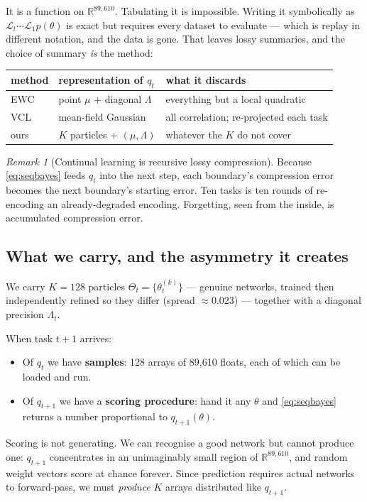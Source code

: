 \documentclass[11pt]{article}
\theoremstyle{definition}
\theoremstyle{plain}
\theoremstyle{remark}
\newtheorem{remark}[definition]{Remark}
\newcommand{\Rb}{\mathbb{R}}
\newcommand{\Lh}{\mathcal{L}}
\begin{document}
It is a function on $\Rb^{89{,}610}$. Tabulating it is impossible. Writing it
symbolically as $\Lh_t \cdots \Lh_1 p(\theta)$ is exact but requires every
dataset to evaluate --- which is replay in different notation, and the data is
gone. That leaves lossy summaries, and the choice of summary \emph{is} the
method:

\begin{center}
\begin{tabular}{lll}
\toprule
method & representation of $q_t$ & what it discards \\
\midrule
EWC & point $\mu$ + diagonal $\Lambda$ & everything but a local quadratic \\
VCL & mean-field Gaussian & all correlation; re-projected each task \\
ours & $K$ particles + $(\mu, \Lambda)$ & whatever the $K$ do not cover \\
\bottomrule
\end{tabular}
\end{center}

\begin{remark}[Continual learning is recursive lossy compression]
Because \eqref{eq:seqbayes} feeds $q_t$ into the next step, each boundary's
compression error becomes the next boundary's starting error. Ten tasks is ten
rounds of re-encoding an already-degraded encoding. Forgetting, seen from the
inside, is accumulated compression error.
\end{remark}

\subsection{What we carry, and the asymmetry it creates}

We carry $K = 128$ particles $\Theta_t = \{\theta_t^{(k)}\}$ --- genuine
networks, trained then independently refined so they differ (spread $\approx
0.023$) --- together with a diagonal precision $\Lambda_t$.

When task $t+1$ arrives:
\begin{itemize}
\item Of $q_t$ we have \textbf{samples}: 128 arrays of 89,610 floats, each of
which can be loaded and run.
\item Of $q_{t+1}$ we have a \textbf{scoring procedure}: hand it any $\theta$
and \eqref{eq:seqbayes} returns a number proportional to $q_{t+1}(\theta)$.
\end{itemize}

Scoring is not generating. We can recognise a good network but cannot produce
one: $q_{t+1}$ concentrates in an unimaginably small region of
$\Rb^{89{,}610}$, and random weight vectors score at chance forever. Since
prediction requires actual networks to forward-pass, we must \emph{produce}
$K$ arrays distributed like $q_{t+1}$.
\end{document}
